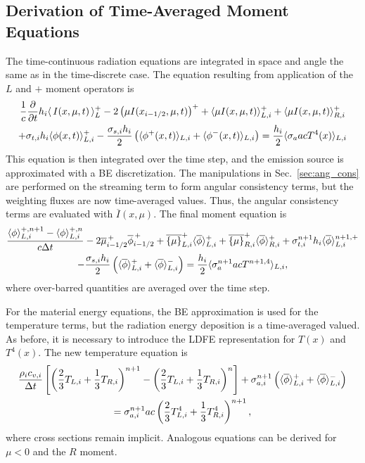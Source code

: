 \subsection{Derivation of Time-Averaged Moment Equations}

The time-continuous radiation equations are integrated in space and angle the same as in
the time-discrete case.  The equation resulting from application of the $L$ and $+$ moment
operators is
\begin{multline}
    \frac{1}{c}   \frac{\partial  }{\partial t} h_i \langle \,I(x,\mu,t)\, \rangle^+_L - 2\left({\mu}
    I(x_{i-1/2},\mu,t)\right)^+ + \langle \mu I(x,\mu,t) \rangle^+_{L,i} 
    + \langle \mu I(x,\mu,t) \rangle^+_{R,i} \\ +  \sigma_{t,i} h_i \langle \phi(x,t) \rangle_{L,i}^{+} -
    \frac{\sigma_{s,i} h_i}{2} \left( \langle \phi^+(x,t) \rangle_{L,i} +
    \langle \phi^-(x,t) \rangle_{L,i}\right) = \frac{h_i}{2} \langle \sigma_a a c T^4(x) \rangle_{L,i} 
\end{multline}
This equation is then integrated over the time step, and the emission source is
approximated with a BE discretization.  The manipulations in Sec.~\ref{sec:ang_cons} are
performed on the streaming term to form angular consistency terms, but the weighting fluxes are now
time-averaged values.  Thus, the angular consistency terms are evaluated with $\overline
I(x,\mu)$.
The final moment equation is 
\begin{multline}\label{eq:t_moml_ex}
    \frac{\langle \phi \rangle_{L,i}^{+,n+1} - \langle \phi \rangle_{L,i}^{+,n}}{c \Delta t}
    -2\overline {\mu}_{i-1/2}^{\,+} \overline \phi_{i-1/2}^{\,+} + \overline{\left\{ \mu \right\}}_{L,i}^{+}
  \langle \overline{\phi} \rangle_{L,i}^{+}
  +  \overline{\left\{ \mu \right\}}_{R,i}^{+}
  \langle \overline{\phi} \rangle_{R,i}^{+} +  \sigma_{t,i}^{n+1} h_i 
  \langle \overline\phi \rangle_{L,i}^{n+1,+} \\-  \frac{\sigma_{s,i} h_i}{2} \left( \langle \overline{\phi} \rangle_{L,i}^{+} +
  \langle \overline{\phi} \rangle_{L,i}^{-}\right) = \frac{h_i}{2} \langle \sigma_a^{n+1} a c T^{n+1,4} \rangle_{L,i},
\end{multline}
where over-barred quantities are averaged over the time step.  

For the material energy equations, the BE approximation is used for the temperature
terms, but the radiation energy deposition is a
time-averaged valued.  As before, it is necessary to introduce the LDFE representation for
$T(x)$ and $T^4(x)$.  The new temperature equation is 
\begin{multline}\label{eq:Tt_moml_ex}
     \frac{\rho_i c_{v,i}}{\Delta t}\left[ \left(\frac{2}{3}T_{L,i} + \frac{1}{3}T_{R,i}
        \right)^{n+1} - \left(\frac{2}{3}T_{L,i} + \frac{1}{3}T_{R,i}
    \right)^{n} \right]  + \sigma_{a,i}^{n+1} \left( \langle \overline{\phi} \rangle_{L,i}^+ +
    \langle \overline{\phi} \rangle_{L,i}^- \right) \\ = \sigma_{a,i}^{n+1}a c
\left( \frac{2}{3} T_{L,i}^4 + \frac{1}{3}T_{R,i}^4
        \right)^{n+1},
\end{multline}
where cross sections remain implicit.
Analogous equations can be derived for $\mu<0$ and the $R$ moment.

